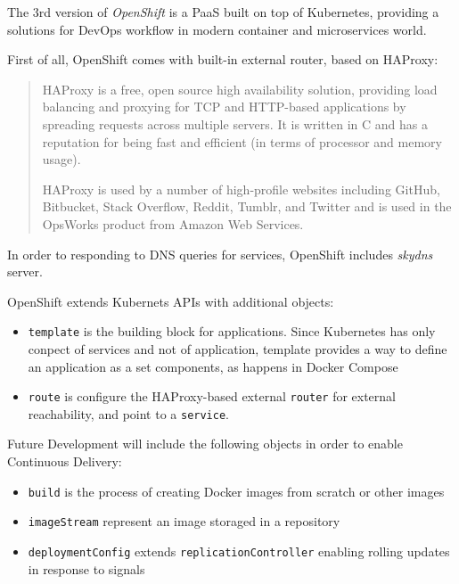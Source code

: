 The 3rd version of \emph{OpenShift} is a PaaS built on top of
Kubernetes, providing a solutions for DevOps workflow in modern
container and microservices world.

First of all, OpenShift comes with built-in external router, based on
HAProxy\cite{HAProxy}:

\begin{quote}
HAProxy is a free, open source high availability solution, providing
load balancing and proxying for TCP and HTTP-based applications by
spreading requests across multiple servers. It is written in C and has a
reputation for being fast and efficient (in terms of processor and
memory usage).

HAProxy is used by a number of high-profile websites including GitHub,
Bitbucket, Stack Overflow, Reddit, Tumblr, and Twitter and is used in
the OpsWorks product from Amazon Web Services.
\end{quote}

In order to responding to DNS queries for services, OpenShift includes
\emph{skydns} server.

OpenShift extends Kubernets APIs with additional objects:

\begin{itemize}
\itemsep1pt\parskip0pt
\item
  \texttt{template} is the building block for applications. Since
  Kubernetes has only conpect of services and not of application,
  template provides a way to define an application as a set components,
  as happens in Docker Compose
\item
  \texttt{route} is configure the HAProxy-based external \texttt{router}
  for external reachability, and point to a \texttt{service}.
\end{itemize}

Future Development will include the following objects in order to enable
Continuous Delivery:

\begin{itemize}
\itemsep1pt\parskip0pt
\item
  \texttt{build} is the process of creating Docker images from scratch
  or other images
\item
  \texttt{imageStream} represent an image storaged in a repository
\item
  \texttt{deploymentConfig} extends \texttt{replicationController}
  enabling rolling updates in response to signals
\end{itemize}

